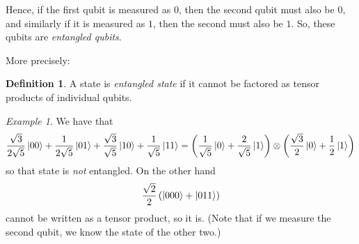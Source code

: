 \documentclass[12pt]{amsart}
\theoremstyle{plain}
\theoremstyle{definition}
\newtheorem{definition}[theorem]{Definition}
\theoremstyle{remark}
\newtheorem{example}[theorem]{Example}
\begin{document}
Hence, if the first qubit is measured as $0$, then the second qubit must also be $0$, and similarly if it is measured as $1$, then the second must also be $1$.  So, these qubits are \emph{entangled qubits}.

More precisely:

\begin{definition}
  A state is \emph{entangled state} if it cannot be factored as tensor products of individual qubits.
\end{definition}

\begin{example}
  We have that
  \[
    \frac{\sqrt{3}}{2\sqrt{5}} \ket{00} + \frac{1}{2\sqrt{5}} \ket{01} + \frac{\sqrt{3}}{\sqrt{5}} \ket{10} + \frac{1}{\sqrt{5}} \ket{11} = \left(\frac{1}{\sqrt{5}}\ket{0} + \frac{2}{\sqrt{5}} \ket{1}\right) \otimes \left(\frac{\sqrt{3}}{2} \ket{0} + \frac{1}{2} \ket{1}\right)
  \]
  so that state is \emph{not} entangled.  On the other hand
  \[
    \frac{\sqrt{2}}{2}\left( \ket{000} + \ket{011} \right)
  \]
  cannot be written as a tensor product, so it is.  (Note that if we measure the second qubit, we know the state of the other two.)
\end{example}
\end{document}
